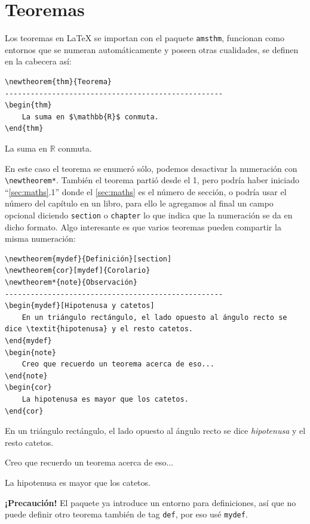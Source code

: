 \documentclass[intro-breve-latex.tex]{subfiles}
\begin{document}
\section{Teoremas}
Los teoremas en \LaTeX{} se importan con el paquete \texttt{amsthm}, funcionan como entornos que se numeran automáticamente y poseen otras cualidades, se definen en la cabecera así:
\begin{lstlisting}
\newtheorem{thm}{Teorema}
---------------------------------------------------
\begin{thm}
	La suma en $\mathbb{R}$ conmuta.
\end{thm}
\end{lstlisting}
\begin{thm}\label{thm:sum}
	La suma en $\mathbb{R}$ conmuta.
\end{thm}
En este caso el teorema se enumeró sólo, podemos desactivar la numeración con \lstinline|\newtheorem*|. También el teorema partió desde el 1, pero podría haber iniciado ``\ref*{sec:maths}.1'' donde el \ref*{sec:maths} es el número de sección, o podría usar el número del capítulo en un libro, para ello le agregamos al final un campo opcional diciendo \texttt{section} o \texttt{chapter} lo que indica que la numeración se da en dicho formato. Algo interesante es que varios teoremas pueden compartir la misma numeración:
\begin{lstlisting}
\newtheorem{mydef}{Definición}[section]
\newtheorem{cor}[mydef]{Corolario}
\newtheorem*{note}{Observación}
---------------------------------------------------
\begin{mydef}[Hipotenusa y catetos]
	En un triángulo rectángulo, el lado opuesto al ángulo recto se dice \textit{hipotenusa} y el resto catetos.
\end{mydef}
\begin{note}
	Creo que recuerdo un teorema acerca de eso...
\end{note}
\begin{cor}
	La hipotenusa es mayor que los catetos.
\end{cor}
\end{lstlisting}
\begin{mydef}\label{def:hyp}
	En un triángulo rectángulo, el lado opuesto al ángulo recto se dice \textit{hipotenusa} y el resto catetos.
\end{mydef}
\begin{note}
	Creo que recuerdo un teorema acerca de eso...
\end{note}
\begin{cor}\label{cor:hyp}
	La hipotenusa es mayor que los catetos.
\end{cor}
\textbf{¡Precaución!} El paquete ya introduce un entorno para definiciones, así que no puede definir otro teorema también de tag \texttt{def}, por eso usé \texttt{mydef}.
\end{document}
